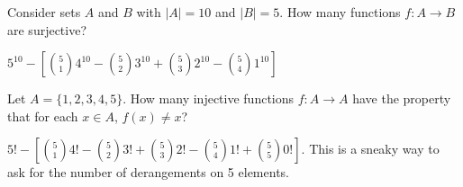 \begin{questions}
\question Consider sets $A$ and $B$ with $|A| = 10$ and $|B| = 5$.  How many functions $f: A \to B$ are surjective?

	\begin{answer}
	$5^{10} - \left[{5 \choose 1}4^{10} - {5 \choose 2}3^{10} + {5 \choose 3}2^{10} - {5 \choose 4}1^{10}\right]$ %
	\end{answer}




\question Let $A = \{1,2,3,4,5\}$.  How many injective functions $f:A \to A$ have the property that for each $x \in A$, $f(x) \ne x$?

	\begin{answer}
	$5! - \left[{5 \choose 1}4! - {5 \choose 2}3! + {5 \choose 3}2! - {5 \choose 4}1! + {5 \choose 5}0!\right]$.  This is a sneaky way to ask for the number of derangements on 5 elements. %
	\end{answer}



\end{questions}
